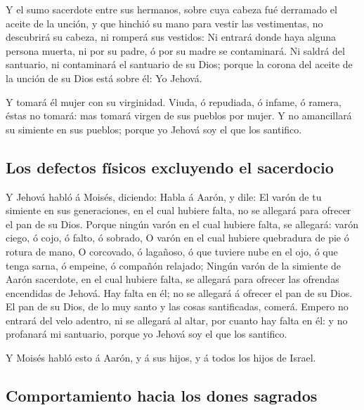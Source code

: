  Y el sumo sacerdote entre sus hermanos, sobre cuya cabeza
fué derramado el aceite de la unción, y que hinchió su mano para vestir
las vestimentas, no descubrirá su cabeza, ni romperá sus vestidos:
 Ni entrará donde haya alguna persona muerta, ni por su
padre, ó por su madre se contaminará.  Ni saldrá del
santuario, ni contaminará el santuario de su Dios; porque la corona del
aceite de la unción de su Dios está sobre él: Yo Jehová.

 Y tomará él mujer con su virginidad.  Viuda,
ó repudiada, ó infame, ó ramera, éstas no tomará: mas tomará virgen de
sus pueblos por mujer.  Y no amancillará su simiente en sus
pueblos; porque yo Jehová soy el que los santifico.

\hypertarget{los-defectos-fuxedsicos-excluyendo-el-sacerdocio}{%
\subsection{Los defectos físicos excluyendo el
sacerdocio}\label{los-defectos-fuxedsicos-excluyendo-el-sacerdocio}}

 Y Jehová habló á Moisés, diciendo:  Habla á
Aarón, y dile: El varón de tu simiente en sus generaciones, en el cual
hubiere falta, no se allegará para ofrecer el pan de su Dios.
 Porque ningún varón en el cual hubiere falta, se allegará:
varón ciego, ó cojo, ó falto, ó sobrado,  O varón en el
cual hubiere quebradura de pie ó rotura de mano,  O
corcovado, ó lagañoso, ó que tuviere nube en el ojo, ó que tenga sarna,
ó empeine, ó compañón relajado;  Ningún varón de la
simiente de Aarón sacerdote, en el cual hubiere falta, se allegará para
ofrecer las ofrendas encendidas de Jehová. Hay falta en él; no se
allegará á ofrecer el pan de su Dios.  El pan de su Dios,
de lo muy santo y las cosas santificadas, comerá.  Empero
no entrará del velo adentro, ni se allegará al altar, por cuanto hay
falta en él: y no profanará mi santuario, porque yo Jehová soy el que
los santifico.

 Y Moisés habló esto á Aarón, y á sus hijos, y á todos los
hijos de Israel.

\hypertarget{comportamiento-hacia-los-dones-sagrados}{%
\subsection{Comportamiento hacia los dones
sagrados}\label{comportamiento-hacia-los-dones-sagrados}}

